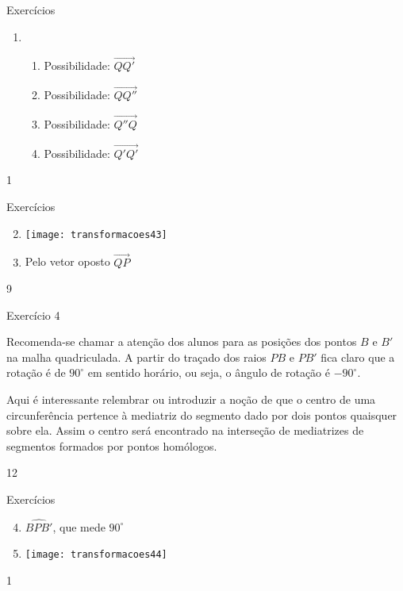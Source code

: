 \marginpar{\vspace{-1.5em}}
\begin{answer}{Exercícios}
{\exerciselist
\begin{enumerate}
\item 
\begin{enumerate}
\item Possibilidade: $\overrightarrow{QQ'}$
\item Possibilidade: $\overrightarrow{QQ''}$
\item Possibilidade: $\overrightarrow{Q''Q}$
\item Possibilidade: $\overrightarrow{Q'Q'}$
\end{enumerate}
\end{enumerate}
}{1}
\end{answer}
\marginpar{\vspace{-.75em}}
\begin{answer}{Exercícios}
{\exerciselist
\begin{enumerate}\setcounter{enumi}{1}
\item {}
{
\texttt{[image: transformacoes43]}
}
\item Pelo vetor oposto $\overrightarrow{QP}$
\end{enumerate}
}{9}
\end{answer}
\begin{sugestions}{Exercício 4}
{
Recomenda-se chamar a atenção dos alunos para as posições dos pontos $B$ e $B'$ na malha quadriculada. A partir do traçado dos raios $PB$ e $PB'$ fica claro que a rotação é de $90^{\circ}$ em sentido horário, ou seja, o ângulo de rotação é $-90^{\circ}$.


Aqui é interessante relembrar ou introduzir a noção de que o centro de uma circunferência pertence à mediatriz do segmento dado por dois pontos quaisquer sobre ela. Assim o centro será encontrado na interseção de mediatrizes de segmentos formados por pontos homólogos.
}{1}{2}
\end{sugestions}
\begin{answer}{Exercícios}
{\exerciselist
\begin{enumerate}\setcounter{enumi}{3}
\item $\hat{BPB'}$, que mede $90^{\circ}$

\item {}
{
\texttt{[image: transformacoes44]}
}
\end{enumerate}
}{1}
\end{answer}

